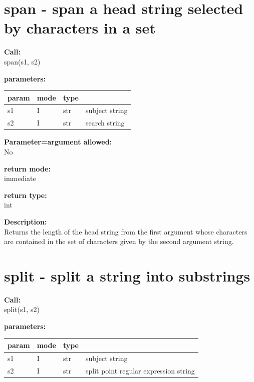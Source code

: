     \section{span - span a head string selected by characters in a set}\label{sec:ifspan}
        
        {\bf Call:} \\
        span(s1, s2)
        
        {\bf parameters:} \\
        \begin{tabular}{| l | l | l | l |}
        \hline
        param  & mode & type & \\
        \hline \hline
        s1 & I & str & subject string   \\ \hline
        s2 & I & str & search string    \\ \hline
        \end{tabular}
        
        {\bf Parameter=argument allowed:} \\
        No
        
        {\bf return mode:} \\
        immediate

        {\bf return type:} \\
        int
        
        {\bf Description:} \\
        Returns the length of the head string from the first argument whose characters
        are contained in the set of characters given by the second argument
        string.
       

    \section{split - split a string into substrings}\label{sec:ifsplit}
        
        {\bf Call:} \\
        split(s1, s2)
        
        {\bf parameters:} \\
        \begin{tabular}{| l | l | l | l |}
        \hline
        param  & mode & type & \\
        \hline \hline
        s1 & I & str & subject string                           \\ \hline
        s2 & I & str & split point regular expression string    \\ \hline
        \end{tabular}
        

